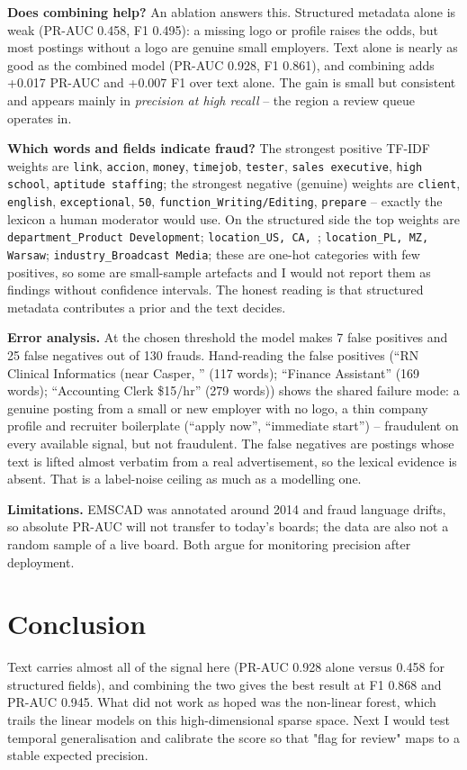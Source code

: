 \documentclass[10pt,conference]{IEEEtran}
\begin{document}
\textbf{Does combining help?} An ablation answers this. Structured metadata alone
is weak (PR-AUC 0.458,
F1 0.495): a missing logo or profile raises the odds, but most
postings without a logo are genuine small employers. Text alone is nearly as good as the
combined model (PR-AUC 0.928, F1 0.861), and
combining adds +0.017 PR-AUC and
+0.007 F1 over text alone. The gain is small but
consistent and appears mainly in \emph{precision at high recall} -- the region a review queue
operates in.

\textbf{Which words and fields indicate fraud?} The strongest positive TF-IDF weights are
\texttt{link}, \texttt{accion}, \texttt{money}, \texttt{timejob}, \texttt{tester}, \texttt{sales executive}, \texttt{high school}, \texttt{aptitude staffing}; the strongest negative (genuine) weights are \texttt{client}, \texttt{english}, \texttt{exceptional}, \texttt{50}, \texttt{function\_Writing/Editing}, \texttt{prepare} -- exactly the lexicon
a human moderator would use. On the structured side the top weights are \texttt{department\_Product Development}; \texttt{location\_US, CA, }; \texttt{location\_PL, MZ, Warsaw}; \texttt{industry\_Broadcast Media}; these
are one-hot categories with few positives, so some are small-sample artefacts and I would not
report them as findings without confidence intervals. The honest reading is that structured
metadata contributes a prior and the text decides.

\textbf{Error analysis.} At the chosen threshold the model makes 7 false positives
and 25 false negatives out of 130 frauds. Hand-reading the false positives
(``RN Clinical Informatics (near Casper, '' (117 words); ``Finance Assistant'' (169 words); ``Accounting Clerk \$15/hr'' (279 words)) shows the shared failure mode: a genuine posting from a small or new employer
with no logo, a thin company profile and recruiter boilerplate (``apply now'', ``immediate
start'') -- fraudulent on every available signal, but not fraudulent. The false negatives are
postings whose text is lifted almost verbatim from a real advertisement, so the lexical evidence
is absent. That is a label-noise ceiling as much as a modelling one.

\textbf{Limitations.} EMSCAD was annotated around 2014 and fraud language drifts, so absolute
PR-AUC will not transfer to today's boards; the data are also not a random sample of a live
board. Both argue for monitoring precision after deployment.

\section{Conclusion}
Text carries almost all of the signal here (PR-AUC 0.928 alone
versus 0.458 for structured fields), and combining the two
gives the best result at F1 0.868 and PR-AUC 0.945. What did not
work as hoped was the non-linear forest, which trails the linear models on this
high-dimensional sparse space. Next I would test temporal generalisation and calibrate the
score so that "flag for review" maps to a stable expected precision.
\end{document}
